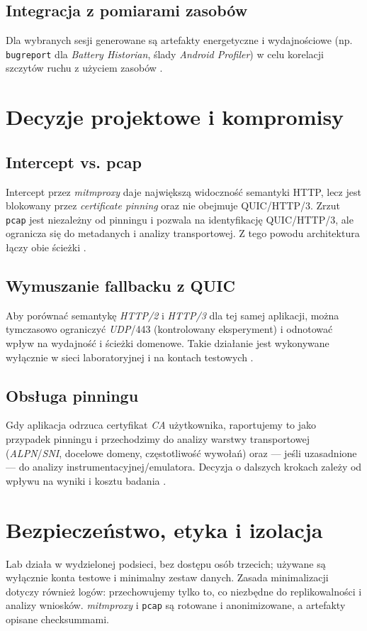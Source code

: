 \subsection{Integracja z pomiarami zasobów}
Dla wybranych sesji generowane są artefakty energetyczne i wydajnościowe (np. \texttt{bugreport} dla \textit{Battery Historian}, ślady \textit{Android Profiler}) w celu korelacji szczytów ruchu z użyciem zasobów \cite{BatteryHistorian,AndroidProfiler}.

\section{Decyzje projektowe i kompromisy}
\subsection{Intercept vs. pcap}
Intercept przez \textit{mitmproxy} daje największą widoczność semantyki HTTP, lecz jest blokowany przez \emph{certificate pinning} oraz nie obejmuje QUIC/HTTP/3. Zrzut \texttt{pcap} jest niezależny od pinningu i pozwala na identyfikację QUIC/HTTP/3, ale ogranicza się do metadanych i analizy transportowej. Z tego powodu architektura łączy obie ścieżki \cite{MitmproxyDocs,OWASPMASTGIntercept,RFC9114}.

\subsection{Wymuszanie fallbacku z QUIC}
Aby porównać semantykę \emph{HTTP/2} i \emph{HTTP/3} dla tej samej aplikacji, można tymczasowo ograniczyć \emph{UDP}/443 (kontrolowany eksperyment) i odnotować wpływ na wydajność i ścieżki domenowe. Takie działanie jest wykonywane wyłącznie w sieci laboratoryjnej i na kontach testowych \cite{RFC9114,OWASPMASTGIntercept}.

\subsection{Obsługa pinningu}
Gdy aplikacja odrzuca certyfikat \emph{CA} użytkownika, raportujemy to jako przypadek pinningu i przechodzimy do analizy warstwy transportowej (\emph{ALPN}/\emph{SNI}, docelowe domeny, częstotliwość wywołań) oraz — jeśli uzasadnione — do analizy instrumentacyjnej/emulatora. Decyzja o dalszych krokach zależy od wpływu na wyniki i kosztu badania \cite{OWASPMASTGPinning,Frida}.

\section{Bezpieczeństwo, etyka i izolacja}
Lab działa w wydzielonej podsieci, bez dostępu osób trzecich; używane są wyłącznie konta testowe i minimalny zestaw danych. Zasada minimalizacji dotyczy również logów: przechowujemy tylko to, co niezbędne do replikowalności i analizy wniosków. \textit{mitmproxy} i \texttt{pcap} są rotowane i anonimizowane, a artefakty opisane checksummami.

